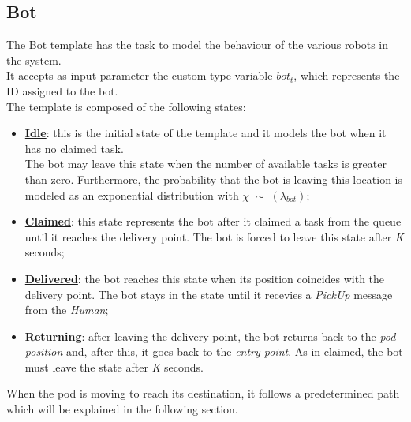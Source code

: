 \documentclass{article}
\begin{document}
		
		\subsection{Bot}
			The Bot template has the task to model the behaviour of the various robots in the system. \\
			It accepts as input parameter the custom-type variable $bot_t$, which represents the ID assigned to the bot.\\
			The template is composed of the following states:
			\begin{itemize}
				\item \textbf{\underline{Idle}}: this is the initial state of the template and it models the bot when it has no claimed task.\\The bot may leave this state when the number of available tasks is greater than zero. Furthermore, the probability that the bot is leaving this location is modeled as an exponential distribution with $\chi\;\sim\;(\lambda_{bot})$;
				\item \textbf{\underline{Claimed}}: this state represents the bot after it claimed a task from the queue until it reaches the delivery point. The bot is forced to leave this state after \emph{K} seconds;
				\item \textbf{\underline{Delivered}}: the bot reaches this state when its position coincides with the delivery point. The bot stays in the state until it recevies a \emph{PickUp} message from the \emph{Human};
				\item \textbf{\underline{Returning}}: after leaving the delivery point, the bot returns back to the \emph{pod position} and, after this, it goes back to the \emph{entry point}. As in claimed, the bot must leave the state after \emph{K} seconds.
			\end{itemize}
			When the pod is moving to reach its destination, it follows a predetermined path which will be explained in the following section.
			
\end{document}
